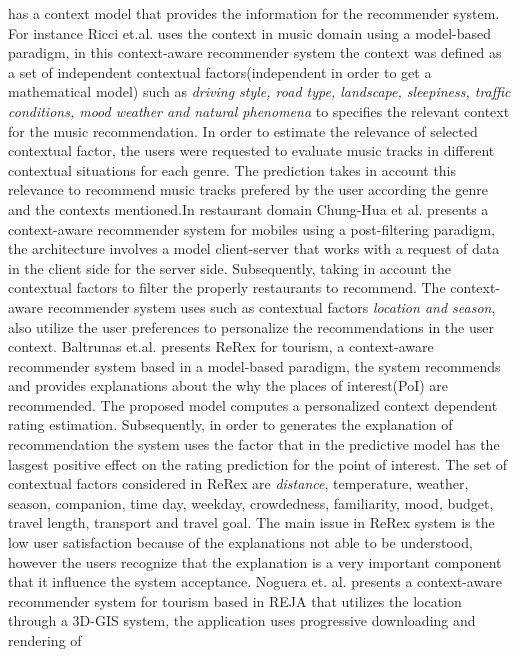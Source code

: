 has a context model that provides the information for the recommender
system. For instance Ricci et.al. \cite{baltrunas2011incarmusic} uses
the context in music domain using a model-based paradigm, in this
context-aware recommender system the context was defined as a set of
independent contextual factors(independent in order to get a
mathematical model) such as \textit{driving style, road type,
landscape, sleepiness, traffic conditions, mood weather and natural
phenomena} to specifies the relevant context for the music
recommendation. In order to estimate the relevance of selected
contextual factor, the users were requested to evaluate music tracks
in different contextual situations for each genre. The prediction
takes in account this relevance to recommend music tracks prefered by
the user according the genre and the contexts mentioned.In
restaurant domain Chung-Hua et al.\cite{chu2013chinese} presents a
context-aware recommender system for mobiles using a post-filtering
paradigm, the architecture involves a model client-server that works
with a request of data in the client side for the server side.
Subsequently, taking in account the contextual factors to filter the
properly restaurants to recommend. The context-aware recommender
system uses such as contextual factors \textit{location and season}, 
also utilize the user preferences to personalize the recommendations
in the user context.
Baltrunas et.al.\cite{baltrunas2011context} presents ReRex for tourism, 
a context-aware recommender system based in a model-based paradigm, the system
recommends and provides explanations about the why the places of
interest(PoI) are recommended. The proposed model computes a
personalized context dependent rating estimation. Subsequently, in
order to generates the explanation of recommendation the system uses
the factor that in the predictive model has the lasgest positive
effect on the rating prediction for the point of interest. The set of
contextual factors considered in ReRex are \textit{distance},
temperature, weather, season, companion, time day, weekday,
crowdedness, familiarity, mood, budget, travel length, transport and
travel goal. The main issue in ReRex system is the low user
satisfaction because of the explanations not able to be understood,
however the users recognize that the explanation is a very important
component that it influence the system acceptance. Noguera et. al.
\cite{noguera2012mobile} presents a context-aware recommender system
for tourism based in REJA that utilizes the location through a 3D-GIS
system, the application uses progressive downloading and rendering of
